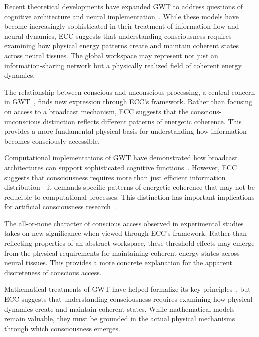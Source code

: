 Recent theoretical developments have expanded GWT to address questions of cognitive architecture and neural implementation~\cite{Mashour2020, Dehaene2021}. While these models have become increasingly sophisticated in their treatment of information flow and neural dynamics, ECC suggests that understanding consciousness requires examining how physical energy patterns create and maintain coherent states across neural tissues. The global workspace may represent not just an information-sharing network but a physically realized field of coherent energy dynamics.

The relationship between conscious and unconscious processing, a central concern in GWT~\cite{Dehaene2011, Lamme2006}, finds new expression through ECC's framework. Rather than focusing on access to a broadcast mechanism, ECC suggests that the conscious-unconscious distinction reflects different patterns of energetic coherence. This provides a more fundamental physical basis for understanding how information becomes consciously accessible.

Computational implementations of GWT have demonstrated how broadcast architectures can support sophisticated cognitive functions~\cite{Franklin1999, Shanahan2012}. However, ECC suggests that consciousness requires more than just efficient information distribution - it demands specific patterns of energetic coherence that may not be reducible to computational processes. This distinction has important implications for artificial consciousness research~\cite{seth2024conscious, butlin2023consciousnessartificialintelligenceinsights}.

The all-or-none character of conscious access observed in experimental studies~\cite{Sergent2004, Super2001} takes on new significance when viewed through ECC's framework. Rather than reflecting properties of an abstract workspace, these threshold effects may emerge from the physical requirements for maintaining coherent energy states across neural tissues. This provides a more concrete explanation for the apparent discreteness of conscious access.

Mathematical treatments of GWT have helped formalize its key principles~\cite{Wallace2005, Barrett2011}, but ECC suggests that understanding consciousness requires examining how physical dynamics create and maintain coherent states. While mathematical models remain valuable, they must be grounded in the actual physical mechanisms through which consciousness emerges.

